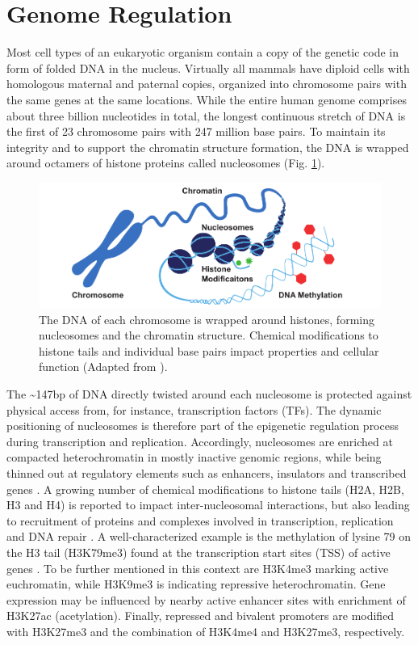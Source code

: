 \section{Genome Regulation}
\label{sec:intro:bio}

Most cell types of an eukaryotic organism contain a copy of the genetic code in form of folded DNA in the nucleus.
Virtually all mammals have diploid cells with homologous maternal and paternal copies, organized into chromosome pairs with the same genes at the same locations.
While the entire human genome comprises about three billion nucleotides in total, the longest continuous stretch of DNA is the first of 23 chromosome pairs with 247 million base pairs. 
To maintain its integrity and to support the chromatin structure formation, the DNA is wrapped around octamers of histone proteins called nucleosomes (Fig. \ref{fig:intro:chromatin}).


\begin{figure}[h]
	\centering
	\includegraphics[width=1.0\textwidth]{figures/intro/chromatin.pdf}
	\captionsetup{format=plain}
	\caption[Chromosome to nucleotide structure]{The DNA of each chromosome is wrapped around histones, forming nucleosomes and the chromatin structure. Chemical modifications to histone tails and individual base pairs impact properties and cellular function (Adapted from \cite{zymo2020}).}
	\label{fig:intro:chromatin}
\end{figure}

The \textasciitilde 147bp of DNA directly twisted around each nucleosome is protected against physical access from, for instance, transcription factors (TFs). 
The dynamic positioning of nucleosomes is therefore part of the epigenetic regulation process during transcription and replication.
Accordingly, nucleosomes are enriched at compacted heterochromatin in mostly inactive genomic regions, while being thinned out at regulatory elements such as enhancers, insulators and transcribed genes \cite{Klemm2019}. 
A growing number of chemical modifications to histone tails (H2A, H2B, H3 and H4) is reported to impact inter-nucleosomal interactions, but also leading to recruitment of proteins and complexes involved in transcription, replication and DNA repair \cite{Bannister2011}. 
A well-characterized example is the methylation of lysine 79 on the H3 tail (H3K79me3) found at the transcription start sites (TSS) of active genes \cite{Lawrence2016}. 
To be further mentioned in this context are H3K4me3 marking active euchromatin, while H3K9me3 is indicating repressive heterochromatin.
Gene expression may be influenced by nearby active enhancer sites with enrichment of H3K27ac (acetylation).
Finally, repressed and bivalent promoters are modified with H3K27me3 and the combination of H3K4me4 and H3K27me3, respectively.

